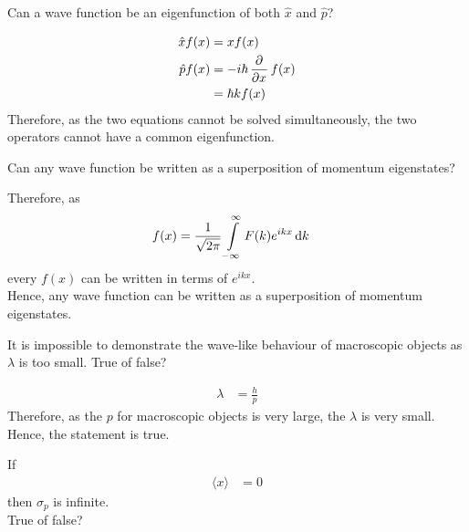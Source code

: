 \documentclass[titlepage, fleqn, a4paper, 12pt, twoside]{article}
\theoremstyle{definition}
\theoremstyle{theorem}
\begin{document}
\begin{question}
	Can a wave function be an eigenfunction of both $\hat{x}$ and $\hat{p}$?
\end{question}

\begin{solution}
	\begin{align*}
		\hat{x} f(x) &= x f(x)\\
		\hat{p} f(x) &= -i \hbar \dpd{}{x} f(x)\\
		&= \hbar k f(x)
	\end{align*}
	Therefore, as the two equations cannot be solved simultaneously, the two operators cannot have a common eigenfunction.
\end{solution}

\begin{question}
	Can any wave function be written as a superposition of momentum eigenstates?
\end{question}

\begin{solution}
	Therefore, as
	\begin{align*}
		f(x) &= \frac{1}{\sqrt{2 \pi}} \int\limits_{-\infty}^{\infty} F(k) e^{i k x} \dif k
	\end{align*}
	every $f(x)$ can be written in terms of $e^{i k x}$.\\
	Hence, any wave function can be written as a superposition of momentum eigenstates.
\end{solution}

\begin{question}
	It is impossible to demonstrate the wave-like behaviour of macroscopic objects as $\lambda$ is too small.
	True of false?
\end{question}

\begin{solution}
	\begin{align*}
		\lambda &= \frac{h}{p}
	\end{align*}
	Therefore, as the $p$ for macroscopic objects is very large, the $\lambda$ is very small.
	Hence, the statement is true.
\end{solution}

\begin{question}
	If
	\begin{align*}
		\langle x \rangle &= 0
	\end{align*}
	then $\sigma_p$ is infinite.\\
	True of false?
\end{question}
\end{document}
